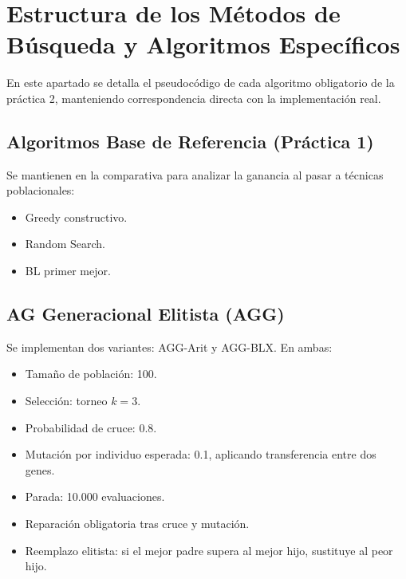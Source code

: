 \newpage
\section{Estructura de los Métodos de Búsqueda y Algoritmos Específicos}
\label{sec:algoritmos}

En este apartado se detalla el pseudocódigo de cada algoritmo obligatorio de la
práctica 2, manteniendo correspondencia directa con la implementación real.

\subsection{Algoritmos Base de Referencia (Práctica 1)}

Se mantienen en la comparativa para analizar la ganancia al pasar a técnicas
poblacionales:

\begin{itemize}[noitemsep]
    \item Greedy constructivo.
    \item Random Search.
    \item BL primer mejor.
\end{itemize}

\subsection{AG Generacional Elitista (AGG)}

Se implementan dos variantes: AGG-Arit y AGG-BLX. En ambas:

\begin{itemize}[noitemsep]
    \item Tamaño de población: 100.
    \item Selección: torneo $k=3$.
    \item Probabilidad de cruce: 0.8.
    \item Mutación por individuo esperada: 0.1, aplicando transferencia entre dos genes.
    \item Parada: 10.000 evaluaciones.
    \item Reparación obligatoria tras cruce y mutación.
    \item Reemplazo elitista: si el mejor padre supera al mejor hijo, sustituye al peor hijo.
\end{itemize}

